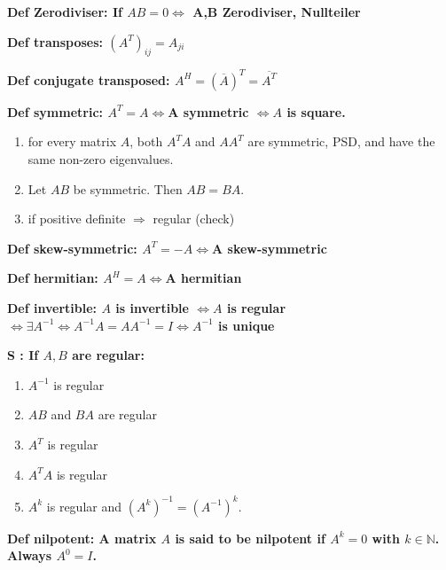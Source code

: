 \documentclass[7pt,landscape, margin = 0.1mm]{article}
\newcommand{\DEF}[2]{\color{chaptercolor}\bf{Def #1}:\color{black}    \hspace{0.2cm} #2}
\newcommand{\SA}[2]{\color{chaptercolor}\bf{S #1}:\color{black}    \hspace{0.2cm} #2}
\begin{document}
\begin{multicols}{4}
\begin{flushleft}
{\DEF{Zerodiviser}{If $AB=0 \iff $ A,B Zerodiviser, Nullteiler}

\DEF{transposes}{ $ (A^T)_{ij}=A_{ji} $}

\DEF{conjugate transposed}{$ A^H = (\overline{A})^T=\overline{A^{T}}$}

\DEF{symmetric}{$A^T = A \Leftrightarrow $A symmetric $\Leftrightarrow A$ is square.
\begin{enumerate}[nolistsep]
    \item for every matrix $A$, both $A^TA$ and $AA^T$ are symmetric, PSD, and have the same non-zero eigenvalues.
    \item Let $AB$ be symmetric. Then $AB=BA$.
    \item if positive definite $\Rightarrow$ regular (check)
\end{enumerate}

\DEF{skew-symmetric}{$A^T = -A  \iff $A skew-symmetric}

\DEF{hermitian}{$A^H = A  \iff $A hermitian}

\DEF{invertible}{$A$ is invertible $\Leftrightarrow A$ is regular $\Leftrightarrow \exists A^{-1} \Leftrightarrow A^{-1}A=AA^{-1}=I \Leftrightarrow A^{-1}$ is unique}

\SA{}{If $A, B$ are regular: \begin{enumerate}[nolistsep]
  \item $A^{-1}$ is regular
  \item $AB$ and $BA$ are regular
  \item $A^T$ is regular
  \item $A^TA$ is regular
  \item $A^k$ is regular and $(A^k)^{-1}=(A^{-1})^k$.
\end{enumerate}}

\DEF{nilpotent}{A matrix $A$ is said to be nilpotent if $A^k = 0$ with $k \in \mathbb{N}$. Always $A^0=I$.}

}}
\end{flushleft}
\end{multicols}
\end{document}
